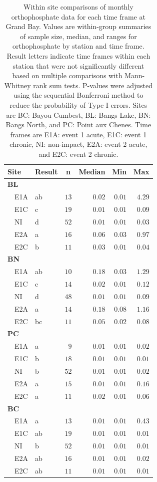 \documentclass[letterpaper,12pt]{article}\usepackage[]{graphicx}\usepackage[]{color}
\begin{document}
\begin{table}[!tbp]
\caption{Within site comparisons  of monthly orthophosphate data for each time frame at Grand Bay.  Values are within-group summaries of sample size, median, and ranges for orthophosphate by station and time frame.  Result letters indicate time frames within each station that were not significantly different based on multiple comparisons with Mann-Whitney rank sum tests.  P-values were adjusted using the sequential Bonferroni method to reduce the probability of Type I errors. Sites are BC: Bayou Cumbest, BL: Bangs Lake, BN: Bangs North, and PC: Point aux Chenes.  Time frames are E1A: event 1 acute, E1C: event 1 chronic, NI: non-impact, E2A: event 2 acute, and E2C: event 2 chronic.\label{tab:orthtab1}} 
\begin{center}
\begin{tabular}{llrrrr}
\hline\hline
\multicolumn{1}{l}{Site}&\multicolumn{1}{c}{Result}&\multicolumn{1}{c}{n}&\multicolumn{1}{c}{Median}&\multicolumn{1}{c}{Min}&\multicolumn{1}{c}{Max}\tabularnewline
\hline
{\bfseries BL}&&&&&\tabularnewline
~~E1A&ab&$13$&$0.02$&$0.01$&$4.29$\tabularnewline
~~E1C&c&$19$&$0.01$&$0.01$&$0.09$\tabularnewline
~~NI&d&$52$&$0.01$&$0.01$&$0.03$\tabularnewline
~~E2A&a&$16$&$0.06$&$0.03$&$0.97$\tabularnewline
~~E2C&b&$11$&$0.03$&$0.01$&$0.04$\tabularnewline
\hline
{\bfseries BN}&&&&&\tabularnewline
~~E1A&ab&$10$&$0.18$&$0.03$&$1.29$\tabularnewline
~~E1C&c&$14$&$0.02$&$0.01$&$0.12$\tabularnewline
~~NI&d&$48$&$0.01$&$0.01$&$0.09$\tabularnewline
~~E2A&a&$14$&$0.18$&$0.08$&$1.16$\tabularnewline
~~E2C&bc&$11$&$0.05$&$0.02$&$0.08$\tabularnewline
\hline
{\bfseries PC}&&&&&\tabularnewline
~~E1A&a&$ 9$&$0.01$&$0.01$&$0.02$\tabularnewline
~~E1C&b&$18$&$0.01$&$0.01$&$0.01$\tabularnewline
~~NI&b&$52$&$0.01$&$0.01$&$0.02$\tabularnewline
~~E2A&a&$15$&$0.01$&$0.01$&$0.16$\tabularnewline
~~E2C&a&$11$&$0.02$&$0.01$&$0.06$\tabularnewline
\hline
{\bfseries BC}&&&&&\tabularnewline
~~E1A&a&$13$&$0.01$&$0.01$&$0.43$\tabularnewline
~~E1C&ab&$19$&$0.01$&$0.01$&$0.01$\tabularnewline
~~NI&b&$52$&$0.01$&$0.01$&$0.01$\tabularnewline
~~E2A&ab&$16$&$0.01$&$0.01$&$0.02$\tabularnewline
~~E2C&ab&$11$&$0.01$&$0.01$&$0.01$\tabularnewline
\hline
\end{tabular}\end{center}

\end{table}
\end{document}
